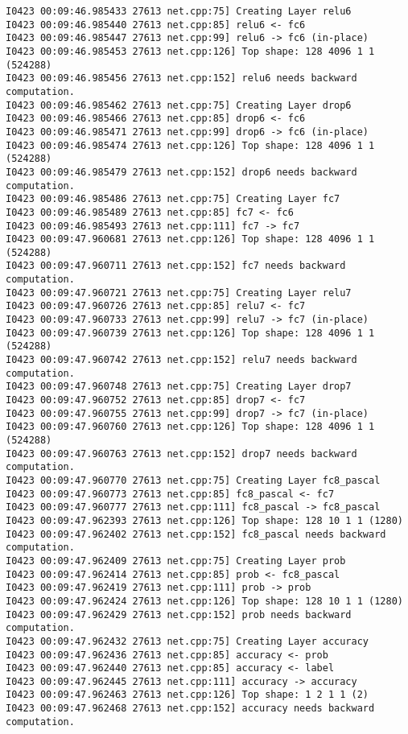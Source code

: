 \documentclass[a4]{article}
\begin{document}
\begin{lstlisting}
I0423 00:09:46.985433 27613 net.cpp:75] Creating Layer relu6
I0423 00:09:46.985440 27613 net.cpp:85] relu6 <- fc6
I0423 00:09:46.985447 27613 net.cpp:99] relu6 -> fc6 (in-place)
I0423 00:09:46.985453 27613 net.cpp:126] Top shape: 128 4096 1 1 (524288)
I0423 00:09:46.985456 27613 net.cpp:152] relu6 needs backward computation.
I0423 00:09:46.985462 27613 net.cpp:75] Creating Layer drop6
I0423 00:09:46.985466 27613 net.cpp:85] drop6 <- fc6
I0423 00:09:46.985471 27613 net.cpp:99] drop6 -> fc6 (in-place)
I0423 00:09:46.985474 27613 net.cpp:126] Top shape: 128 4096 1 1 (524288)
I0423 00:09:46.985479 27613 net.cpp:152] drop6 needs backward computation.
I0423 00:09:46.985486 27613 net.cpp:75] Creating Layer fc7
I0423 00:09:46.985489 27613 net.cpp:85] fc7 <- fc6
I0423 00:09:46.985493 27613 net.cpp:111] fc7 -> fc7
I0423 00:09:47.960681 27613 net.cpp:126] Top shape: 128 4096 1 1 (524288)
I0423 00:09:47.960711 27613 net.cpp:152] fc7 needs backward computation.
I0423 00:09:47.960721 27613 net.cpp:75] Creating Layer relu7
I0423 00:09:47.960726 27613 net.cpp:85] relu7 <- fc7
I0423 00:09:47.960733 27613 net.cpp:99] relu7 -> fc7 (in-place)
I0423 00:09:47.960739 27613 net.cpp:126] Top shape: 128 4096 1 1 (524288)
I0423 00:09:47.960742 27613 net.cpp:152] relu7 needs backward computation.
I0423 00:09:47.960748 27613 net.cpp:75] Creating Layer drop7
I0423 00:09:47.960752 27613 net.cpp:85] drop7 <- fc7
I0423 00:09:47.960755 27613 net.cpp:99] drop7 -> fc7 (in-place)
I0423 00:09:47.960760 27613 net.cpp:126] Top shape: 128 4096 1 1 (524288)
I0423 00:09:47.960763 27613 net.cpp:152] drop7 needs backward computation.
I0423 00:09:47.960770 27613 net.cpp:75] Creating Layer fc8_pascal
I0423 00:09:47.960773 27613 net.cpp:85] fc8_pascal <- fc7
I0423 00:09:47.960777 27613 net.cpp:111] fc8_pascal -> fc8_pascal
I0423 00:09:47.962393 27613 net.cpp:126] Top shape: 128 10 1 1 (1280)
I0423 00:09:47.962402 27613 net.cpp:152] fc8_pascal needs backward computation.
I0423 00:09:47.962409 27613 net.cpp:75] Creating Layer prob
I0423 00:09:47.962414 27613 net.cpp:85] prob <- fc8_pascal
I0423 00:09:47.962419 27613 net.cpp:111] prob -> prob
I0423 00:09:47.962424 27613 net.cpp:126] Top shape: 128 10 1 1 (1280)
I0423 00:09:47.962429 27613 net.cpp:152] prob needs backward computation.
I0423 00:09:47.962432 27613 net.cpp:75] Creating Layer accuracy
I0423 00:09:47.962436 27613 net.cpp:85] accuracy <- prob
I0423 00:09:47.962440 27613 net.cpp:85] accuracy <- label
I0423 00:09:47.962445 27613 net.cpp:111] accuracy -> accuracy
I0423 00:09:47.962463 27613 net.cpp:126] Top shape: 1 2 1 1 (2)
I0423 00:09:47.962468 27613 net.cpp:152] accuracy needs backward computation.

\end{lstlisting}
\end{document}
